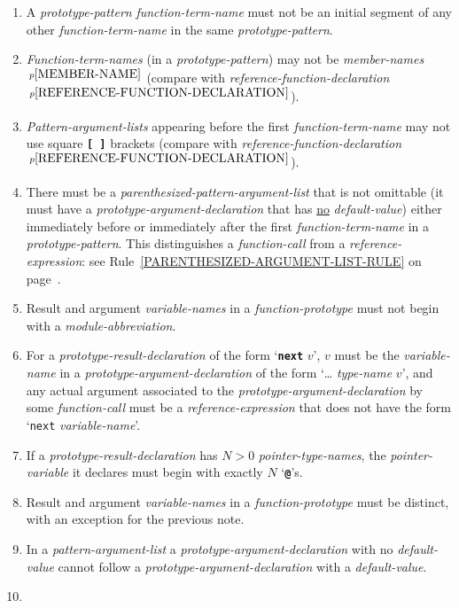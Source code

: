 \documentclass[12pt]{article}
\newcommand{\TT}[1]{{\tt \bfseries #1}}
\newcommand{\pagnote}[1]{$\,^{p\pageref{#1}}$}
\begin{document}
\begin{enumerate}\label{FUNCTION-DECLARATION-RULES}
\item
A {\em prototype-pattern} {\em function-term-name} must not be
an initial segment of any other {\em function-term-name}
in the same {\em prototype-pattern}.
\item
{\em Function-term-names} (in a {\em prototype-pattern})
may not be {\em member-names}\pagnote{MEMBER-NAME}
(compare with {\em reference-function-declaration}%
\pagnote{REFERENCE-FUNCTION-DECLARATION}).
\item
{\em Pattern-argument-lists} appearing before the first
{\em function-term-name} may not use square \TT{[~]} brackets
(compare with {\em reference-function-declaration}%
\pagnote{REFERENCE-FUNCTION-DECLARATION}).
\item
There must be a {\em parenthesized-pattern-argument-list} that
is not omittable (it must have a {\em prototype-argument-declaration}
that has \underline{no} {\em default-value}) either immediately
before or immediately after the first {\em function-term-name}
in a {\em prototype-pattern}.  This distinguishes a
{\em function-call} from a {\em reference-expression}:
see Rule~\ref{PARENTHESIZED-ARGUMENT-LIST-RULE} on
page~\pageref{PARENTHESIZED-ARGUMENT-LIST-RULE}.
\item
Result and argument {\em variable-names}
in a {\em function-prototype} must not begin with a {\em module-abbreviation}.
\item
\label{PROTOTYPE-NEXT-RESULT}
For a {\em prototype-result-declaration} of the form `\TT{next} $v$',
$v$ must be the {\em vari\-able-name} in a {\em prototype-argument-declaration}
of the form `\dots{} {\em type-name} $v$', and
any actual argument associated to the {\em prototype-argument-declaration}
by some {\em function-call}
must be a {\em reference-expression} that
does not have the form `{\tt next} {\em variable-name}'.
\item If a {\em prototype-result-declaration}
has $N>0$ {\em pointer-type-names}, the {\em pointer-variable}
it declares must begin with exactly $N$ `\TT{@}'s.
\item
Result and argument {\em variable-names}
in a {\em function-prototype} must
be distinct, with an exception for the previous note.
\item
In a {\em pattern-argument-list}
a {\em prototype-argument-declaration} with no {\em de\-fault-value} cannot
follow a {\em prototype-argument-declaration} with a {\em default-value}.
\item

\end{enumerate}
\end{document}
